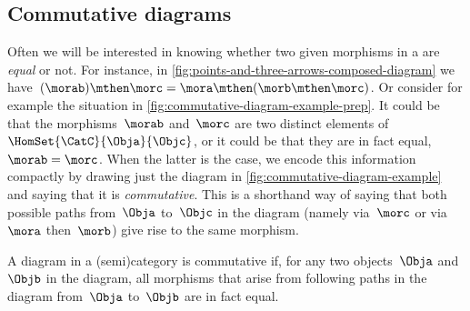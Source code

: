 \subsection{Commutative diagrams}

Often we will be interested in knowing whether two given morphisms in a  are \emph{equal} or not.
For instance, in \cref{fig:points-and-three-arrows-composed-diagram} we have~$(\morab) \mthen \morc = \mora \mthen (\morb \mthen \morc)$.
Or consider for example the situation in \cref{fig:commutative-diagram-example-prep}.
It could be that the morphisms~$\morab$ and~$\morc$ are two distinct elements of~$\HomSet{\CatC}{\Obja}{\Objc}$, or it could be that they are in fact equal,~$\morab = \morc$.
When the latter is the case, we encode this information compactly by drawing just the diagram in \cref{fig:commutative-diagram-example} and saying that it is \emph{commutative}.
This is a shorthand way of saying that both possible paths from~$\Obja$ to~$\Objc$ in the diagram (namely via~$\morc$ or via~$\mora$ then~$\morb$) give rise to the same morphism.

\begin{marginfigure}
    \centering
    \caption{}
    \label{fig:commutative-diagram-example-prep}
\end{marginfigure}

\begin{marginfigure}
    \centering
    \caption{}
    \label{fig:commutative-diagram-example}
\end{marginfigure}

\begin{marginfigure}
    \centering
    \caption{}
    \label{fig:commutative-square-example}
\end{marginfigure}

\begin{marginfigure}
    \centering
    \caption{}
    \label{fig:commutative-diagram-with-identity}
\end{marginfigure}

\begin{definition}
    \label{def:commutative-diagram}
    A diagram in a (semi)category is commutative if, for any two objects~$\Obja$ and~$\Objb$ in the diagram, all morphisms that arise from following paths in the diagram from~$\Obja$ to~$\Objb$ are in fact equal.
\end{definition}


